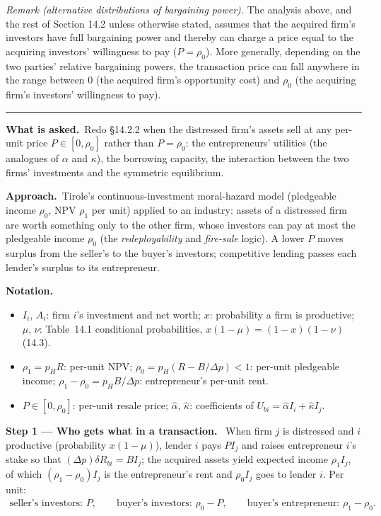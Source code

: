 \documentclass[11pt,a4paper]{article}
\newcommand{\notation}{\par\noindent\textbf{Notation.}}
\newcommand{\step}[2]{\par\medskip\noindent\textbf{Step #1 --- #2.}~}
\newcommand{\asked}{\par\medskip\noindent\textbf{What is asked.}~}
\newcommand{\approach}{\par\smallskip\noindent\textbf{Approach.}~}
\newcommand{\stmtend}{\par\endgroup\nopagebreak\noindent\rule{\linewidth}{0.4pt}\par\medskip}
\begin{document}
\emph{Remark (alternative distributions of bargaining power).} The analysis above, and the rest of
Section 14.2 unless otherwise stated, assumes that the acquired firm's investors have full
bargaining power and thereby can charge a price equal to the acquiring investors' willingness to pay
(\(P = \rho_0\)). More generally, depending on the two parties' relative bargaining powers, the
transaction price can fall anywhere in the range between 0 (the acquired firm's opportunity cost)
and \(\rho_0\) (the acquiring firm's investors' willingness to pay).
\stmtend

\asked Redo \S14.2.2 when the distressed firm's assets sell at any per-unit price $P\in[0,\rho_0]$
rather than $P=\rho_0$: the entrepreneurs' utilities (the analogues of $\alpha$ and $\kappa$), the
borrowing capacity, the interaction between the two firms' investments and the symmetric equilibrium.

\approach Tirole's continuous-investment moral-hazard model (pledgeable income $\rho_0$, NPV $\rho_1$
per unit) applied to an industry: assets of a distressed firm are worth something only to the other
firm, whose investors can pay at most the pledgeable income $\rho_0$ (the \emph{redeployability} and
\emph{fire-sale} logic). A lower $P$ moves surplus from the seller's to the buyer's investors; competitive
lending passes each lender's surplus to its entrepreneur.

\notation
\begin{itemize}
  \item $I_i$, $A_i$: firm $i$'s investment and net worth; $x$: probability a firm is productive; $\mu$, $\nu$: Table~14.1 conditional probabilities, $x(1-\mu)=(1-x)(1-\nu)$ (14.3).
  \item $\rho_1=p_HR$: per-unit NPV; $\rho_0=p_H(R-B/\Delta p)<1$: per-unit pledgeable income; $\rho_1-\rho_0=p_HB/\Delta p$: entrepreneur's per-unit rent.
  \item $P\in[0,\rho_0]$: per-unit resale price; $\hat\alpha$, $\hat\kappa$: coefficients of $U_{bi}=\hat\alpha I_i+\hat\kappa I_j$.
\end{itemize}

\step{1}{Who gets what in a transaction} When firm $j$ is distressed and $i$ productive (probability
$x(1-\mu)$), lender $i$ pays $PI_j$ and raises entrepreneur $i$'s stake so that $(\Delta p)\delta R_{bi}=BI_j$;
the acquired assets yield expected income $\rho_1I_j$, of which $(\rho_1-\rho_0)I_j$ is the entrepreneur's
rent and $\rho_0I_j$ goes to lender $i$. Per unit:
\begin{align}
  \text{seller's investors: } P, \qquad \text{buyer's investors: } \rho_0-P, \qquad \text{buyer's entrepreneur: } \rho_1-\rho_0. \label{r9e14-split}
\end{align}
\end{document}
